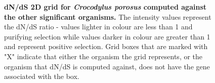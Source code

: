 \documentclass{article}
\begin{document}
\begin{figure}[H]
\centering
{}
\caption{\textbf{dN/dS 2D grid for \textit{Crocodylus porosus} computed against the other significant organisms.} The intensity values represent the dN/dS ratio - values lighter in colour are less than 1 and purifying selection while values darker in colour are greater than 1 and represent positive selection. Grid boxes that are marked with "X" indicate that either the organism the grid represents, or the organism that dN/dS is computed against, does not have the gene associated with the box.}
\label{sup_fig_22}
\end{figure}
\end{document}
